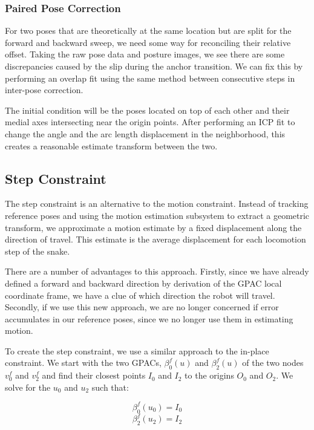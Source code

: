\subsubsection{Paired Pose Correction}
\label{pairedposecorrection}

For two poses that are theoretically at the same location but are split for the forward and backward sweep, we need some way for reconciling their relative offset. Taking the raw pose data and posture images, we see there are some discrepancies caused by the slip during the anchor transition. We can fix this by performing an overlap fit using the same method between consecutive steps in inter-pose correction.

The initial condition will be the poses located on top of each other and their medial axes intersecting near the origin points. After performing an ICP fit to change the angle and the arc length displacement in the neighborhood, this creates a reasonable estimate transform between the two.

\subsection{Step Constraint}
\label{stepconstraint}

The step constraint is an alternative to the motion constraint. Instead of tracking reference poses and using the motion estimation subsystem to extract a geometric transform, we approximate a motion estimate by a fixed displacement along the direction of travel. This estimate is the average displacement for each locomotion step of the snake.

There are a number of advantages to this approach. Firstly, since we have already defined a forward and backward direction by derivation of the GPAC local coordinate frame, we have a clue of which direction the robot will travel. Secondly, if we use this new approach, we are no longer concerned if error accumulates in our reference poses, since we no longer use them in estimating motion.

To create the step constraint, we use a similar approach to the in-place constraint. We start with the two GPACs, $\beta_0^f(u)$ and $\beta_2^f(u)$ of the two nodes $v_0^f$ and $v_2^f$ and find their closest points $I_0$ and $I_2$ to the origins $O_0$ and $O_2$. We solve for the $u_0$ and $u_2$ such that:


\begin{equation}
\beta_0^f(u_0) = I_0
\end{equation}
\begin{equation}
\beta_2^f(u_2) = I_2
\end{equation}


